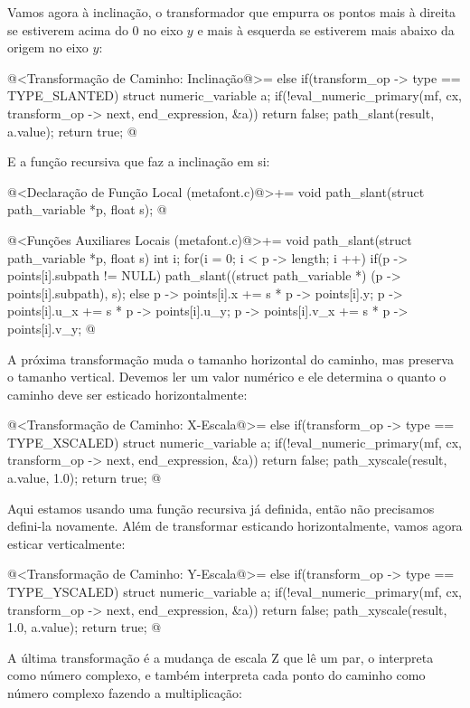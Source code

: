 {Vamos agora à inclinação, o transformador que empurra os pontos mais à
direita se estiverem acima do 0 no eixo $y$ e mais à esquerda se
estiverem mais abaixo da origem no eixo $y$:

\iniciocodigo
@<Transformação de Caminho: Inclinação@>=
else if(transform_op -> type == TYPE_SLANTED){
  struct numeric_variable a;
  if(!eval_numeric_primary(mf, cx, transform_op -> next, end_expression,
                          &a))
    return false;
  path_slant(result, a.value);  
  return true;
}
@
\fimcodigo

E a função recursiva que faz a inclinação em si:

\iniciocodigo
@<Declaração de Função Local (metafont.c)@>+=
void path_slant(struct path_variable *p, float s);
@
\fimcodigo

\iniciocodigo
@<Funções Auxiliares Locais (metafont.c)@>+=
void path_slant(struct path_variable *p, float s){
  int i;
  for(i = 0; i < p -> length; i ++){
    if(p -> points[i].subpath != NULL)
      path_slant((struct path_variable *) (p -> points[i].subpath), s);
    else{
      p -> points[i].x += s * p -> points[i].y;
      p -> points[i].u_x += s * p -> points[i].u_y;
      p -> points[i].v_x += s * p -> points[i].v_y;
    }
  }
}
@
\fimcodigo

A próxima transformação muda o tamanho horizontal do caminho, mas
preserva o tamanho vertical. Devemos ler um valor numérico e ele
determina o quanto o caminho deve ser esticado horizontalmente:


\iniciocodigo
@<Transformação de Caminho: X-Escala@>=
else if(transform_op -> type == TYPE_XSCALED){
  struct numeric_variable a;
  if(!eval_numeric_primary(mf, cx, transform_op -> next, end_expression,
                           &a))
    return false;
  path_xyscale(result, a.value, 1.0);  
  return true;
}
@
\fimcodigo

Aqui estamos usando uma função recursiva já definida, então não
precisamos defini-la novamente. Além de transformar esticando
horizontalmente, vamos agora esticar verticalmente:

\iniciocodigo
@<Transformação de Caminho: Y-Escala@>=
else if(transform_op -> type == TYPE_YSCALED){
  struct numeric_variable a;
  if(!eval_numeric_primary(mf, cx, transform_op -> next, end_expression,
                           &a))
    return false;
  path_xyscale(result, 1.0, a.value);  
  return true;
}
@
\fimcodigo

A última transformação é a mudança de escala Z que lê um par, o
interpreta como número complexo, e também interpreta cada ponto do
caminho como número complexo fazendo a multiplicação:

}
